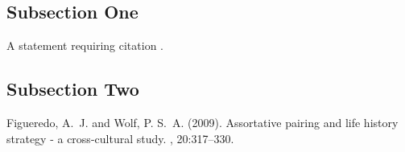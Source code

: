 \documentclass[twoside,twocolumn]{article}
\begin{document}
\subsection{Subsection One}

A statement requiring citation \cite{Figueredo:2009dg}.
\blindtext %

\subsection{Subsection Two}

\blindtext %


\begin{thebibliography}{99} %

Figueredo, A.~J. and Wolf, P. S.~A. (2009).
\newblock Assortative pairing and life history strategy - a cross-cultural
  study.
, 20:317--330.
 
\end{thebibliography}

\end{document}
